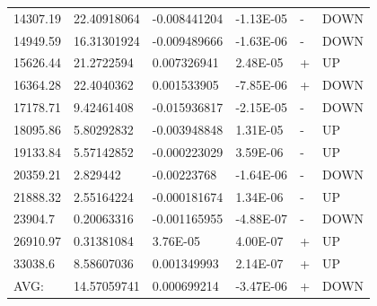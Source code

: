 \documentclass{article}
\begin{document}
\begin{table}[]
\begin{tabular}{@{}llllll@{}}
14307.19     & 22.40918064      & -0.008441204     & -1.13E-05 & -    & DOWN    \\
14949.59     & 16.31301924      & -0.009489666     & -1.63E-06 & -    & DOWN    \\
15626.44     & 21.2722594       & 0.007326941      & 2.48E-05  & +    & UP      \\
16364.28     & 22.4040362       & 0.001533905      & -7.85E-06 & +    & DOWN    \\
17178.71     & 9.42461408       & -0.015936817     & -2.15E-05 & -    & DOWN    \\
18095.86     & 5.80292832       & -0.003948848     & 1.31E-05  & -    & UP      \\
19133.84     & 5.57142852       & -0.000223029     & 3.59E-06  & -    & UP      \\
20359.21     & 2.829442         & -0.00223768      & -1.64E-06 & -    & DOWN    \\
21888.32     & 2.55164224       & -0.000181674     & 1.34E-06  & -    & UP      \\
23904.7      & 0.20063316       & -0.001165955     & -4.88E-07 & -    & DOWN    \\
26910.97     & 0.31381084       & 3.76E-05         & 4.00E-07  & +    & UP      \\
33038.6      & 8.58607036       & 0.001349993      & 2.14E-07  & +    & UP      \\
AVG:         & 14.57059741      & 0.000699214      & -3.47E-06 & +    & DOWN    \\ \bottomrule
\end{tabular}
\end{table}
\end{document}
